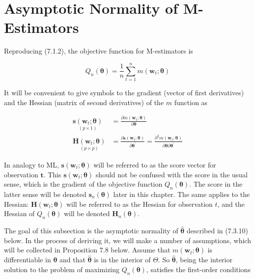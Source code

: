 \documentclass[10pt]{article}
\begin{document}
\section*{Asymptotic Normality of M-Estimators}
Reproducing (7.1.2), the objective function for M-estimators is


\begin{equation*}
Q_{n}(\boldsymbol{\theta})=\frac{1}{n} \sum_{t=1}^{n} m\left(\mathbf{w}_{t} ; \boldsymbol{\theta}\right) \tag{7.3.1}
\end{equation*}


It will be convenient to give symbols to the gradient (vector of first derivatives) and the Hessian (matrix of second derivatives) of the $m$ function as


\begin{align*}
\underset{(p \times 1)}{\mathbf{s}\left(\mathbf{w}_{t} ; \boldsymbol{\theta}\right)} & =\frac{\partial m\left(\mathbf{w}_{t} ; \boldsymbol{\theta}\right)}{\partial \boldsymbol{\theta}}  \tag{7.3.2}\\
\underset{(p \times p)}{\mathbf{H}\left(\mathbf{w}_{t} ; \boldsymbol{\theta}\right)} & =\frac{\partial \mathbf{s}\left(\mathbf{w}_{t} ; \boldsymbol{\theta}\right)}{\partial \boldsymbol{\theta}^{\prime}}=\frac{\partial^{2} m\left(\mathbf{w}_{t} ; \boldsymbol{\theta}\right)}{\partial \boldsymbol{\theta} \partial \boldsymbol{\theta}^{\prime}} \tag{7.3.3}
\end{align*}


In analogy to ML, $\mathbf{s}\left(\mathbf{w}_{t} ; \boldsymbol{\theta}\right)$ will be referred to as the score vector for observation $\boldsymbol{t}$. This $\mathbf{s}\left(\mathbf{w}_{t} ; \boldsymbol{\theta}\right)$ should not be confused with the score in the usual sense, which is the gradient of the objective function $Q_{n}(\boldsymbol{\theta})$. The score in the latter sense will be denoted $\mathbf{s}_{n}(\boldsymbol{\theta})$ later in this chapter. The same applies to the Hessian: $\mathbf{H}\left(\mathbf{w}_{t} ; \boldsymbol{\theta}\right)$ will be referred to as the Hessian for observation $t$, and the Hessian of $Q_{n}(\boldsymbol{\theta})$ will be denoted $\mathbf{H}_{n}(\boldsymbol{\theta})$.

The goal of this subsection is the asymptotic normality of $\hat{\boldsymbol{\theta}}$ described in (7.3.10) below. In the process of deriving it, we will make a number of assumptions, which will be collected in Proposition 7.8 below. Assume that $m\left(\mathbf{w}_{t} ; \boldsymbol{\theta}\right)$ is differentiable in $\boldsymbol{\theta}$ and that $\hat{\boldsymbol{\theta}}$ is in the interior of $\Theta$. So $\hat{\boldsymbol{\theta}}$, being the interior solution to the problem of maximizing $Q_{n}(\boldsymbol{\theta})$, satisfies the first-order conditions
\end{document}
